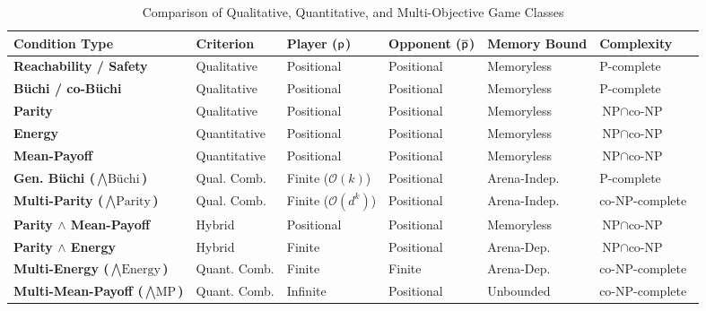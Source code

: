 \documentclass{article}
\begin{document}
\begin{table}[t]
\centering
\caption{Comparison of Qualitative, Quantitative, and Multi-Objective Game Classes}
\label{tab:game_conditions_comparison}
\small
\setlength{\tabcolsep}{1pt}
\begin{tabular}{@{}llllll@{}}
\toprule
\textbf{Condition Type} & \textbf{Criterion} & \textbf{Player ($\mathsf{p}$)} & \textbf{Opponent ($\overline{\mathsf{p}}$)} & \textbf{Memory Bound} & \textbf{Complexity} \\ 
\midrule
\textbf{Reachability / Safety} & Qualitative & Positional & Positional & Memoryless & $\text{P}$-complete \\
\textbf{Büchi / co-Büchi} & Qualitative & Positional & Positional & Memoryless & $\text{P}$-complete \\
\textbf{Parity} & Qualitative & Positional & Positional & Memoryless & $\text{NP} \cap \text{co-NP}$ \\
\textbf{Energy} & Quantitative & Positional & Positional & Memoryless & $\text{NP} \cap \text{co-NP}$~\cite{Chatterjee:2010EP} \\
\textbf{Mean-Payoff} & Quantitative & Positional & Positional & Memoryless & $\text{NP} \cap \text{co-NP}$~\cite{ChatterjeeHJ05} \\ 
\midrule
\textbf{Gen. Büchi ($\bigwedge \text{Büchi}$)} & Qual. Comb. & Finite ($\mathcal{O}(k)$) & Positional & Arena-Indep.~\cite{Bouyer:2022} & $\text{P}$-complete \\
\textbf{Multi-Parity ($\bigwedge \text{Parity}$)} & Qual. Comb. & Finite ($\mathcal{O}(d^k)$) & Positional & Arena-Indep.~\cite{Bouyer:2022} & $\text{co-NP}$-complete \\
\textbf{Parity $\land$ Mean-Payoff} & Hybrid & Positional & Positional & Memoryless & $\text{NP} \cap \text{co-NP}$~\cite{ChatterjeeHJ05} \\
\textbf{Parity $\land$ Energy} & Hybrid & Finite & Positional & Arena-Dep. & $\text{NP} \cap \text{co-NP}$~\cite{Chatterjee:2010EP} \\
\textbf{Multi-Energy ($\bigwedge \text{Energy}$)} & Quant. Comb. & Finite & Finite & Arena-Dep. & $\text{co-NP}$-complete~\cite{Velner:2015} \\
\textbf{Multi-Mean-Payoff ($\bigwedge \text{MP}$)} & Quant. Comb. & Infinite & Positional & Unbounded & $\text{co-NP}$-complete~\cite{Velner:2015} \\ 
\bottomrule
\end{tabular}

\end{table}
\end{document}
